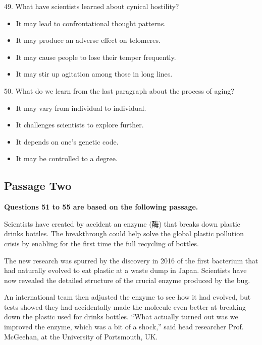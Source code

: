 \documentclass[UTF8,11pt]{ctexart}
\begin{document}
49. What have scientists learned about cynical hostility?


\begin{itemize}[leftmargin=2em,itemsep=.2em,topsep=.4em]\item[A.] It may lead to confrontational thought patterns.
\item[B.] It may produce an adverse effect on telomeres.
\item[C.] It may cause people to lose their temper frequently.
\item[D.] It may stir up agitation among those in long lines.
\end{itemize}

50. What do we learn from the last paragraph about the process of aging?


\begin{itemize}[leftmargin=2em,itemsep=.2em,topsep=.4em]\item[A.] It may vary from individual to individual.
\item[B.] It challenges scientists to explore further.
\item[C.] It depends on one’s genetic code.
\item[D.] It may be controlled to a degree.
\end{itemize}

\subsection*{\textbf{Passage Two}}


\textbf{Questions 51 to 55 are based on the following passage.}


Scientists have created by accident an enzyme (酶) that breaks down plastic drinks bottles. The breakthrough could help solve the global plastic pollution crisis by enabling for the first time the full recycling of bottles.


The new research was spurred by the discovery in 2016 of the first bacterium that had naturally evolved to eat plastic at a waste dump in Japan. Scientists have now revealed the detailed structure of the crucial enzyme produced by the bug.


An international team then adjusted the enzyme to see how it had evolved, but tests showed they had accidentally made the molecule even better at breaking down the plastic used for drinks bottles. “What actually turned out was we improved the enzyme, which was a bit of a shock,” said head researcher Prof. McGeehan, at the University of Portsmouth, UK.
\end{document}
